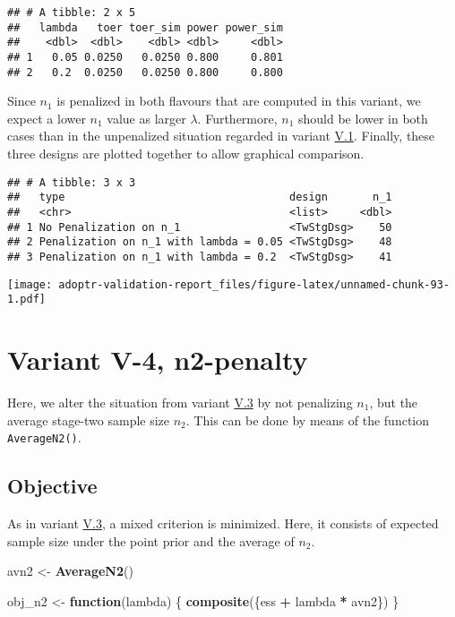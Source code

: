 \documentclass[]{book}
\newenvironment{Shaded}{\begin{snugshade}}{\end{snugshade}}
\newcommand{\ControlFlowTok}[1]{\textcolor[rgb]{0.13,0.29,0.53}{\textbf{#1}}}
\newcommand{\KeywordTok}[1]{\textcolor[rgb]{0.13,0.29,0.53}{\textbf{#1}}}
\newcommand{\NormalTok}[1]{#1}
\newcommand{\OperatorTok}[1]{\textcolor[rgb]{0.81,0.36,0.00}{\textbf{#1}}}
\newcommand{\StringTok}[1]{\textcolor[rgb]{0.31,0.60,0.02}{#1}}
\begin{document}
\begin{verbatim}
## # A tibble: 2 x 5
##   lambda   toer toer_sim power power_sim
##    <dbl>  <dbl>    <dbl> <dbl>     <dbl>
## 1   0.05 0.0250   0.0250 0.800     0.801
## 2   0.2  0.0250   0.0250 0.800     0.800
\end{verbatim}

Since \(n_1\) is penalized in both flavours that are computed in this variant,
we expect a lower \(n_1\) value as larger \(\lambda\).
Furthermore, \(n_1\) should be lower in both cases than in the unpenalized
situation regarded in variant \protect\hyperlink{variantV_1}{V.1}.
Finally, these three designs are plotted together to allow graphical comparison.

\begin{verbatim}
## # A tibble: 3 x 3
##   type                                   design       n_1
##   <chr>                                  <list>     <dbl>
## 1 No Penalization on n_1                 <TwStgDsg>    50
## 2 Penalization on n_1 with lambda = 0.05 <TwStgDsg>    48
## 3 Penalization on n_1 with lambda = 0.2  <TwStgDsg>    41
\end{verbatim}

\texttt{[image: adoptr-validation-report\_files/figure-latex/unnamed-chunk-93-1.pdf]}

\hypertarget{variantV_4}{%
\section{Variant V-4, n2-penalty}\label{variantV_4}}

Here, we alter the situation from variant \protect\hyperlink{variantV_3}{V.3} by not penalizing
\(n_1\), but the average stage-two sample size \(n_2\).
This can be done by means of the function \texttt{AverageN2()}.

\hypertarget{objective-13}{%
\subsection{Objective}\label{objective-13}}

As in variant \protect\hyperlink{variantV_3}{V.3}, a mixed criterion is minimized.
Here, it consists of expected sample size under the point prior and the
average of \(n_2\).

\begin{Shaded}
\begin{Highlighting}[]
\NormalTok{avn2 <-}\StringTok{ }\KeywordTok{AverageN2}\NormalTok{()}

\NormalTok{obj_n2 <-}\StringTok{ }\ControlFlowTok{function}\NormalTok{(lambda) \{}
  \KeywordTok{composite}\NormalTok{(\{ess }\OperatorTok{+}\StringTok{ }\NormalTok{lambda }\OperatorTok{*}\StringTok{ }\NormalTok{avn2\})}
\NormalTok{\}}
\end{Highlighting}
\end{Shaded}
\end{document}
